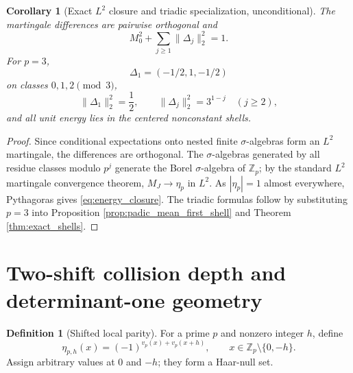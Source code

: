 \documentclass[11pt]{amsart}
\numberwithin{equation}{section}
\theoremstyle{plain}
\newtheorem{corollary}[theorem]{Corollary}
\theoremstyle{definition}
\newtheorem{definition}[theorem]{Definition}
\theoremstyle{remark}
\newcommand{\Z}{\mathbb Z}
\begin{document}
\begin{corollary}[Exact $L^2$ closure and triadic specialization, unconditional]
\label{cor:padic_closure}
The martingale differences are pairwise orthogonal and
\begin{equation}
M_0^2+\sum_{j\ge1}\|\Delta_j\|_2^2=1.
\label{eq:energy_closure}
\end{equation}
For $p=3$,
\begin{equation}
\Delta_1=(-1/2,1,-1/2)
\label{eq:triadic_first_shell}
\end{equation}
on classes $0,1,2\pmod3$,
\begin{equation}
\|\Delta_1\|_2^2=\frac12,
\qquad
\|\Delta_j\|_2^2=3^{1-j}\quad(j\ge2),
\label{eq:triadic_shell_energies}
\end{equation}
and all unit energy lies in the centered nonconstant shells.
\end{corollary}

\begin{proof}
Since conditional expectations onto nested finite $\sigma$-algebras form an $L^2$ martingale, the differences are orthogonal.  The $\sigma$-algebras generated by all residue classes modulo $p^j$ generate the Borel $\sigma$-algebra of $\Z_p$; by the standard $L^2$ martingale convergence theorem, $M_J\to\eta_p$ in $L^2$.  As $|\eta_p|=1$ almost everywhere, Pythagoras gives \eqref{eq:energy_closure}.  The triadic formulas follow by substituting $p=3$ into Proposition \ref{prop:padic_mean_first_shell} and Theorem \ref{thm:exact_shells}.
\end{proof}

\section{Two-shift collision depth and determinant-one geometry}
\label{sec:two_shift}

\begin{definition}[Shifted local parity]
\label{def:eta_ph}
For a prime $p$ and nonzero integer $h$, define
\begin{equation}
\eta_{p,h}(x)=(-1)^{v_p(x)+v_p(x+h)},
\qquad x\in\Z_p\setminus\{0,-h\}.
\label{eq:eta_ph}
\end{equation}
Assign arbitrary values at $0$ and $-h$; they form a Haar-null set.
\end{definition}
\end{document}
